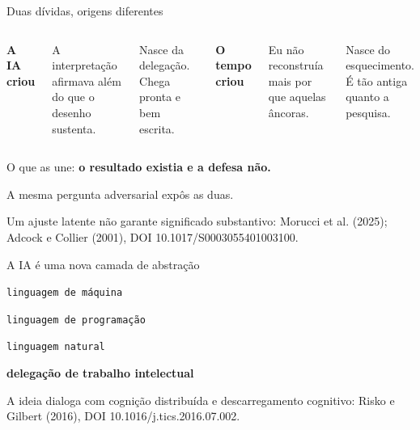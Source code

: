 \documentclass[
  12pt,
  ignorenonframetext,
  aspectratio=169]{beamer}
\begin{document}
\begin{frame}{Duas dívidas, origens diferentes}
\protect{}\label{duas-duxedvidas-origens-diferentes}
\begin{columns}[T,onlytextwidth]
{\color{orange}\Large\textbf{A IA criou}}

\vspace{0.25cm}
\normalsize A interpretação afirmava além do que o desenho sustenta.

\vspace{0.2cm}
\small Nasce da delegação. Chega pronta e bem escrita.

{\color{teal}\Large\textbf{O tempo criou}}

\vspace{0.25cm}
\normalsize Eu não reconstruía mais por que aquelas âncoras.

\vspace{0.2cm}
\small Nasce do esquecimento. É tão antiga quanto a pesquisa.
\end{columns}

\vspace{0.6cm}
\begin{center}
\large O que as une: \textbf{o resultado existia e a defesa não.}

\vspace{0.2cm}
\normalsize A mesma pergunta adversarial expôs as duas.
\end{center}

\vfill{\tiny\color{muted}Um ajuste latente não garante significado substantivo: Morucci et al. (2025); Adcock e Collier (2001), DOI 10.1017/S0003055401003100.}
\end{frame}

\begin{frame}{A IA é uma nova camada de abstração}
\protect{}\label{a-ia-uxe9-uma-nova-camada-de-abstrauxe7uxe3o}
\begin{center}
\vspace{0.2cm}
\large
\texttt{linguagem de máquina}

\vspace{0.05cm}
{\color{teal}\large\downarrow}

\vspace{0.05cm}
\texttt{linguagem de programação}

\vspace{0.05cm}
{\color{teal}\large\downarrow}

\vspace{0.05cm}
\texttt{linguagem natural}

\vspace{0.05cm}
{\color{orange}\large\downarrow}

\vspace{0.05cm}
\textbf{delegação de trabalho intelectual}
\end{center}

\vfill{\tiny\color{muted}A ideia dialoga com cognição distribuída e descarregamento cognitivo: Risko e Gilbert (2016), DOI 10.1016/j.tics.2016.07.002.}
\end{frame}
\end{document}
